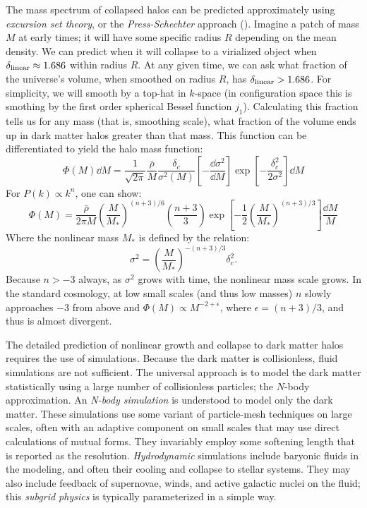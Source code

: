 The mass spectrum of collapsed halos can be predicted approximately
using {\it excursion set theory}, or the {\it Press-Schechter}
approach (\citealt{press74a, bond91a, lacey93a}). Imagine a patch of
mass $M$ at early times; it will have some specific radius $R$
depending on the mean density. We can predict when it will collapse to
a virialized object when $\delta_{\rm linear} \approx 1.686$ within
radius $R$. At any given time, we can ask what fraction of the
universe's volume, when smoothed on radius $R$, has $\delta_{\rm
linear} > 1.686$. For simplicity, we will smooth by a top-hat in
$k$-space (in configuration space this is smothing by the first order
spherical Bessel function $j_1$). Calculating this fraction tells us
for any mass (that is, smoothing scale), what fraction of the volume
ends up in dark matter halos greater than that mass. This function can
be differentiated to yield the halo mass function:
\begin{equation}
\Phi(M) \dd M
= \frac{1}{\sqrt{2\pi}} \frac{\bar \rho}{M} \frac{\delta_c}{\sigma^2(M)} \left[
- \frac{\dd \sigma^2}{\dd
M}\right] \exp\left[-\frac{\delta_c^2}{2\sigma^2}\right] \dd M
\end{equation}
For $P(k)\propto k^n$, one can show:
\begin{equation}
\Phi(M) = \frac{\bar\rho}{2\pi
M} \left(\frac{M}{M_\ast}\right)^{(n+3)/6}
\left(\frac{n+3}{3}\right)
\exp\left[-\frac{1}{2}\left(\frac{M}{M_\ast}\right)^{(n+3)/3}\right] \frac{\dd
M}{M}
\end{equation}
Where the nonlinear mass $M_\ast$ is defined by the relation:
\begin{equation}
\sigma^2 = \left(\frac{M}{M_\ast}\right)^{-(n+3)/3} \delta_c^2.
\end{equation}
Because $n>-3$ always, as $\sigma^2$ grows with time, the nonlinear
mass scale grows.  In the standard cosmology, at low small scales (and
thus low masses) $n$ slowly approaches $-3$ from above and
$\Phi(M) \propto M^{-2 + \epsilon}$, where $\epsilon = (n+3) /3$, and
thus is almost divergent.

The detailed prediction of nonlinear growth and collapse to dark
matter halos requires the use of simulations. Because the dark matter
is collisionless, fluid simulations are not sufficient. The universal
approach is to model the dark matter statistically using a large
number of collisionless particles; the $N$-body approximation. An {\it
N-body simulation} is understood to model only the dark matter. These
simulations use some variant of particle-mesh techniques on large
scales, often with an adaptive component on small scales that may use
direct calculations of mutual forms. They invariably employ some
softening length that is reported as the resolution.  {\it
Hydrodynamic} simulations include baryonic fluids in the modeling, and
often their cooling and collapse to stellar systems. They may also
include feedback of supernovae, winds, and active galactic nuclei on
the fluid; this {\it subgrid physics} is typically parameterized in a
simple way.

